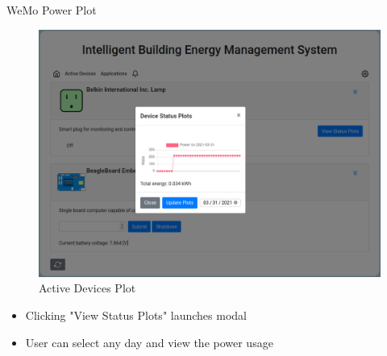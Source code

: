 \documentclass{beamer}
\begin{document}
\begin{frame}{WeMo Power Plot}{} %
    \begin{figure}
        \centering
        \includegraphics[scale=0.15]{figs/ActiveDevices_plot.png}
        \caption{Active Devices Plot}
        \label{fig:active_devices_plot}
    \end{figure}

    \begin{small}
        \begin{itemize}
            \item Clicking "View Status Plots" launches modal
            \item User can select any day and view the power usage
        \end{itemize}
    \end{small}
\end{frame}
\end{document}
